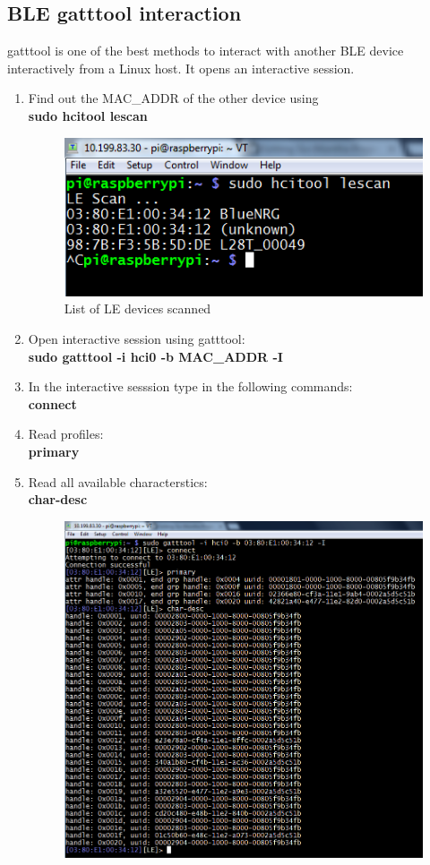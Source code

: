 \subsection{BLE gatttool interaction} 
gatttool is one of the best methods to interact with another BLE device interactively from a Linux host. It opens an interactive session.
	\begin{enumerate}
		\item Find out the MAC\_ADDR of the other device using\\
			\textbf{sudo hcitool lescan}
			\begin{figure}[ht]
				\centering
				\includegraphics[scale=0.5]{images/lescan.png}
				\caption{List of LE devices scanned}
			\end{figure}
		\item Open interactive session using gatttool:\\
			\textbf{sudo gatttool -i hci0 -b MAC\_ADDR -I}
		\item In the interactive sesssion type in the following commands:\\
			\textbf{connect}
		\item Read profiles:\\
			\textbf{primary}
		\item Read all available characterstics:\\
			\textbf{char-desc}
			\begin{figure}[ht]
				\centering
				\includegraphics[scale=0.5]{images/gatttool1.png}

\end{figure}
\end{enumerate}
